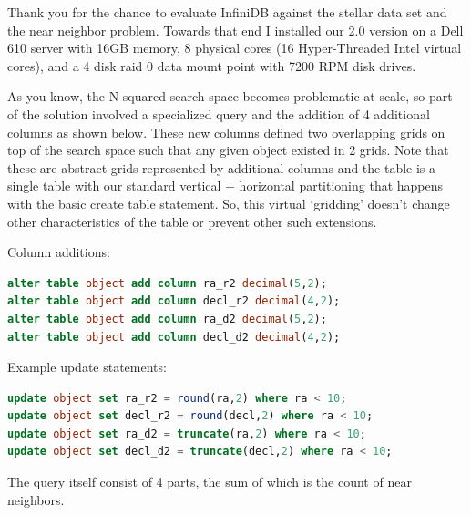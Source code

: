\documentclass[DM,lsstdraft,toc]{lsstdoc}
\begin{document}
Thank you for the chance to evaluate InfiniDB against the stellar data
set and the near neighbor problem. Towards that end I installed our 2.0
version on a Dell 610 server with 16GB memory, 8 physical cores (16
Hyper-Threaded Intel virtual cores), and a 4 disk raid 0 data mount
point with 7200 RPM disk drives.

As you know, the N-squared search space becomes problematic at scale, so
part of the solution involved a specialized query and the addition of 4
additional columns as shown below. These new columns defined two
overlapping grids on top of the search space such that any given object
existed in 2 grids. Note that these are abstract grids represented by
additional columns and the table is a single table with our standard
vertical + horizontal partitioning that happens with the basic create
table statement. So, this virtual `gridding' doesn't change other
characteristics of the table or prevent other such extensions.

Column additions:

\begin{lstlisting}[language=SQL]
alter table object add column ra_r2 decimal(5,2);
alter table object add column decl_r2 decimal(4,2);
alter table object add column ra_d2 decimal(5,2);
alter table object add column decl_d2 decimal(4,2);
\end{lstlisting}

Example update statements:

\begin{lstlisting}[language=SQL]
update object set ra_r2 = round(ra,2) where ra < 10;
update object set decl_r2 = round(decl,2) where ra < 10;
update object set ra_d2 = truncate(ra,2) where ra < 10;
update object set decl_d2 = truncate(decl,2) where ra < 10;
\end{lstlisting}

The query itself consist of 4 parts, the sum of which is the count of
near neighbors.
\end{document}
